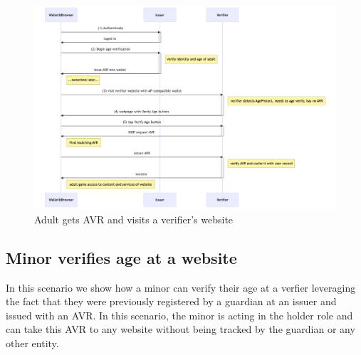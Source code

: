 \documentclass[11pt, oneside]{article}   	%
\begin{document}
\begin{figure}
	\includegraphics[width=\textwidth]{./images/adult-sequence.png}
	\caption{Adult gets AVR and visits a verifier's website}
	\label{fig:adult-seq}
\end{figure}

\subsection{Minor verifies age at a website}

In this scenario we show how a minor can verify their age at a verfier leveraging the fact that they were previously registered by a guardian at an issuer and issued with an AVR. In this scenario, the minor is acting in the holder role and can take this AVR to any website without being tracked by the guardian or any other entity. 
\end{document}
